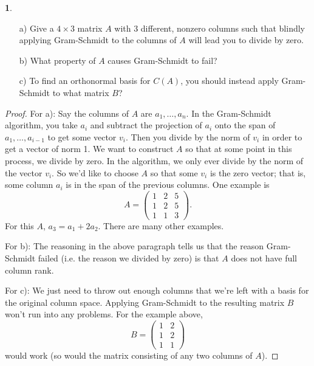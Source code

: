 \documentclass{article}
\theoremstyle{definition}
\newtheorem{prob}{}
\begin{document}
\begin{prob}
	\begin{itemize}
		\item[a)] Give a $4 \times 3$ matrix $A$ with 3 different, nonzero columns such that blindly applying Gram-Schmidt to the columns of $A$ will lead you to divide by zero.
		\item[b)] What property of $A$ causes Gram-Schmidt to fail?
		\item[c)] To find an orthonormal basis for $C(A)$, you should instead apply Gram-Schmidt to what matrix $B$?
	\end{itemize}
\end{prob}

\begin{proof}
	For a): Say the columns of $A$ are $a_1, \dots, a_n$. In the Gram-Schmidt algorithm, you take $a_i$ and subtract the projection of $a_i$ onto the span of $a_1, \dots, a_{i-1}$ to get some vector $v_i$. Then you divide by the norm of $v_i$ in order to get a vector of norm 1. We want to construct $A$ so that at some point in this process, we divide by zero. In the algorithm, we only ever divide by the norm of the vector $v_i$. So we'd like to choose $A$ so that some $v_i$ is the zero vector; that is, some column $a_i$ is in the span of the previous columns. One example is 
	\[A=\begin{pmatrix}
		1& 2& 5\\
		1& 2& 5\\
		1& 1 & 3
	\end{pmatrix}.\]
For this $A$, $a_3=a_1 + 2a_2$. There are many other examples.

For b): The reasoning in the above paragraph tells us that the reason Gram-Schmidt failed (i.e. the reason we divided by zero) is that $A$ does not have full column rank.

For c): We just need to throw out enough columns that we're left with a basis for the original column space. Applying Gram-Schmidt to the resulting matrix $B$ won't run into any problems. For the example above, 
\[B=\begin{pmatrix}
	1& 2\\
	1& 2\\
	1& 1
\end{pmatrix}\]
would work (so would the matrix consisting of any two columns of $A$).
\end{proof}
\end{document}
